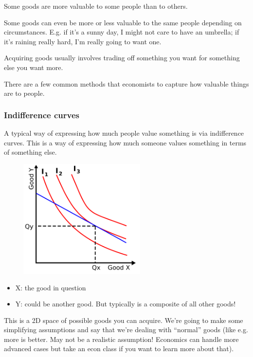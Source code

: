 \documentclass[11pt]{article}
\begin{document}
Some goods are more valuable to some people than to others.

Some goods can even be more or less valuable to the same people depending on circumstances.
E.g. if it's a sunny day, I might not care to have an umbrella; if it's raining really hard, I'm really going to want one. 

Acquiring goods usually involves trading off something you want for something else you want more. 

There are a few common methods that economists to capture how valuable things are to people.

\subsubsection{Indifference curves}

A typical way of expressing how much people value something is via indifference curves. This is a way of expressing how much someone values something in terms of something else. 

\begin{figure}[h]
    \centering
    \includegraphics*[width=2.5in]{indifference.png}
\end{figure}
 

\begin{itemize}
    \item X: the good in question
    \item Y: could be another good. But typically is a composite of all other goods!
\end{itemize}

This is a 2D space of possible goods you can acquire. We're going to make some simplifying assumptions and say that we're dealing with ``normal'' goods (like e.g. more is better. May not be a realistic assumption! Economics can handle more advanced cases but take an econ class if you want to learn more about that).
\end{document}
